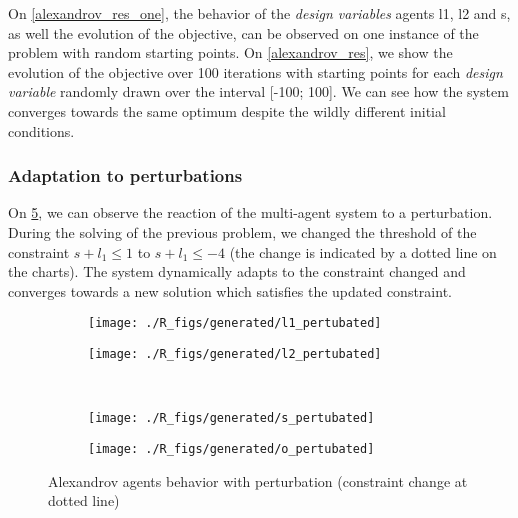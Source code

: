 On \figurename \ref{alexandrov_res_one}, the behavior of the \emph{design variables} agents l1, l2 and s, as well the evolution of the objective, can be observed on one instance of the problem with random starting points. On \figurename \ref{alexandrov_res}, we show the evolution of the objective over 100 iterations with  starting points  for each \emph{design variable} randomly drawn over the interval [-100; 100]. We can see how the system converges towards the same optimum despite the wildly different initial conditions.

\subsubsection*{Adaptation to perturbations}
 
On \figurename \ref{alexandrov_res_pert}, we can observe the reaction of the multi-agent system to a perturbation. During the solving of the previous problem, we changed the threshold of the constraint $s + l_1 \leq 1$ to $s + l_1 \leq -4$ (the change is indicated by a dotted line on the charts). The system dynamically adapts to the constraint changed and converges towards a new solution which satisfies the updated constraint.

\begin{figure}[]
\centering
  	\begin{subfigure}[b]{0.4\textwidth}
		\centering
		\texttt{[image: ./R\_figs/generated/l1\_pertubated]}
		\label{alexandrov_res_pert:l1}
	\end{subfigure}
	\begin{subfigure}[b]{0.4\textwidth}
		\centering
		\texttt{[image: ./R\_figs/generated/l2\_pertubated]}
		\label{alexandrov_res_pert:l2}
	\end{subfigure}
	\vspace{-20pt}
	\\
	\begin{subfigure}[b]{0.4\textwidth}
		\centering
		\texttt{[image: ./R\_figs/generated/s\_pertubated]}
		\label{alexandrov_res_pert:s}
	\end{subfigure}
	\begin{subfigure}[b]{0.4\textwidth}
		\centering
		\texttt{[image: ./R\_figs/generated/o\_pertubated]}
		\label{alexandrov_res_pert:o}
	\end{subfigure}
	
	\caption{Alexandrov agents behavior with perturbation (constraint change at dotted line)}
	\label{alexandrov_res_pert}
	
\end{figure}


